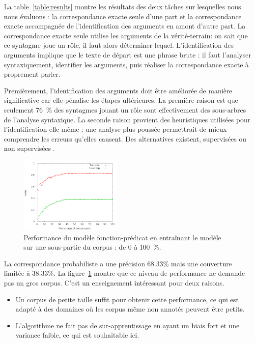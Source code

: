 La table~\ref{table:results} montre les résultats des deux tâches sur
lesquelles nous nous évaluons : la correspondance exacte seule d'une part et la
correspondance exacte accompagnée de l'identification des arguments en amont
d'autre part. La correspondance exacte seule utilise les arguments de la
vérité-terrain: on sait que ce syntagme joue un rôle, il faut alors déterminer
lequel.  L'identification des arguments implique que le texte de départ est une
phrase brute : il faut l'analyser syntaxiquement, identifier les arguments,
puis réaliser la correspondance exacte à proprement parler.

Premièrement, l'identification des arguments doit être améliorée de manière
significative car elle pénalise les étapes ultérieures. La première raison est
que seulement 76~\% des syntagmes jouant un rôle sont effectivement des
sous-arbres de l'analyse syntaxique.
La seconde raison provient des heuristiques utilisées pour l'identification
elle-même : une analyse plus poussée permettrait de mieux comprendre les
erreurs qu'elles causent. Des alternatives existent, supervisées ou non
supervisées \citep{abend2009unsupervised}.

\begin{figure}[t]
    \centering
    \includegraphics[width=0.45\textwidth]{fig/slot-predicate-percents.png}
    \caption{\label{fig:fonction_predicate}Performance du modèle fonction-prédicat en entraînant le modèle sur une sous-partie du corpus : de 0 à 100~\%.}
\end{figure}

La correspondance probabiliste a une précision 68.33\% mais une couverture
limitée à 38.33\%. La figure~\ref{fig:fonction_predicate} montre que ce niveau
de performance ne demande pas un gros corpus. C'est un enseignement intéressant
pour deux raisons.

\begin{itemize}

    \item Un corpus de petite taille suffit pour obtenir cette performance, ce
    qui est adapté à des domaines où les corpus même non annotés peuvent être
    petits.

    \item L'algorithme ne fait pas de sur-apprentissage en ayant un biais fort
    et une variance faible, ce qui est souhaitable ici.

\end{itemize}

